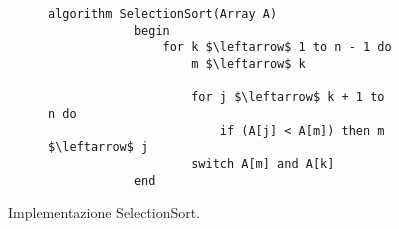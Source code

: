 \documentclass{subfiles}
\begin{document}
\begin{figure*}[!h]
    \centering
    \begin{subfigure}[b]{0.5\textwidth}
        \begin{lstlisting}[language = algol]
            algorithm SelectionSort(Array A)
            begin
                for k $\leftarrow$ 1 to n - 1 do 
                    m $\leftarrow$ k

                    for j $\leftarrow$ k + 1 to n do
                        if (A[j] < A[m]) then m $\leftarrow$ j
                    switch A[m] and A[k]
            end
        \end{lstlisting}
    \end{subfigure}
    \caption{Implementazione SelectionSort.}
\end{figure*}
\end{document}
